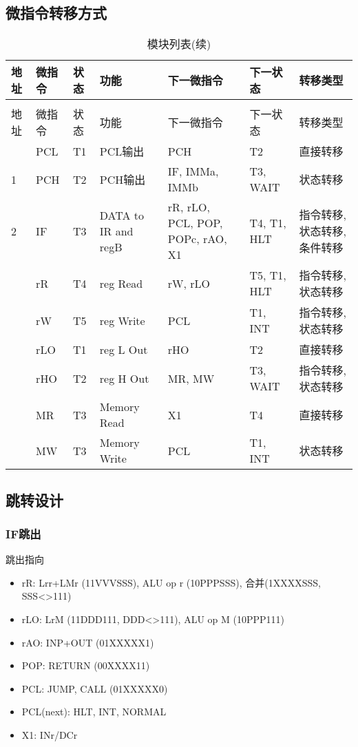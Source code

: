 \documentclass[10pt]{book}
\begin{document}
\subsection{微指令转移方式}
\begin{landscape}
\begin{longtable}{|l|l|l|l|l|l|l|}
\caption{微程序表} \label{tb_micro_prog} \\
\hline
地址 & 微指令 & 状态 & 功能 & 下一微指令 & 下一状态 & 转移类型             \\
\hline
\endfirsthead
\caption{模块列表(续)} \\
\hline
地址 & 微指令 & 状态 & 功能 & 下一微指令 & 下一状态 & 转移类型             \\
\hline
\endhead
\hline
\endfoot
0	& PCL	& T1 	& PCL输出 				& PCH 								& T2 			& 直接转移 \\
1	& PCH 	& T2 	& PCH输出 				& IF, IMMa, IMMb					& T3, WAIT 		& 状态转移 \\
2	& IF  	& T3 	& DATA to IR and regB 	& rR, rLO, PCL, POP, POPc, rAO, X1	& T4, T1, HLT	& 指令转移, 状态转移, 条件转移 \\ 
& rR  	& T4 	& reg Read  			& rW, rLO		 					& T5, T1, HLT 	& 指令转移, 状态转移  \\
& rW  	& T5 	& reg Write 			& PCL								& T1, INT		& 指令转移, 状态转移 \\
& rLO 	& T1 	& reg L Out 			& rHO								& T2			& 直接转移 \\
& rHO 	& T2 	& reg H Out 			& MR, MW							& T3, WAIT		& 指令转移, 状态转移 \\
& MR  	& T3	& Memory Read 			& X1								& T4			& 直接转移 \\
& MW  	& T3	& Memory Write 			& PCL								& T1, INT		& 状态转移 \\ 
\end{longtable}
\end{landscape}

\subsection{跳转设计}
\subsubsection{IF跳出}
跳出指向
\begin{itemize}
  \item rR: Lrr+LMr (11VVVSSS), ALU op r (10PPPSSS), 合并(1XXXXSSS, SSS<>111)
  \item rLO: LrM (11DDD111, DDD<>111), ALU op M (10PPP111)
  \item rAO: INP+OUT (01XXXXX1)
  \item POP: RETURN (00XXXX11)
  \item PCL: JUMP, CALL (01XXXXX0)
  \item PCL(next): HLT, INT, NORMAL
  \item X1: INr/DCr
\end{itemize}
\end{document}
